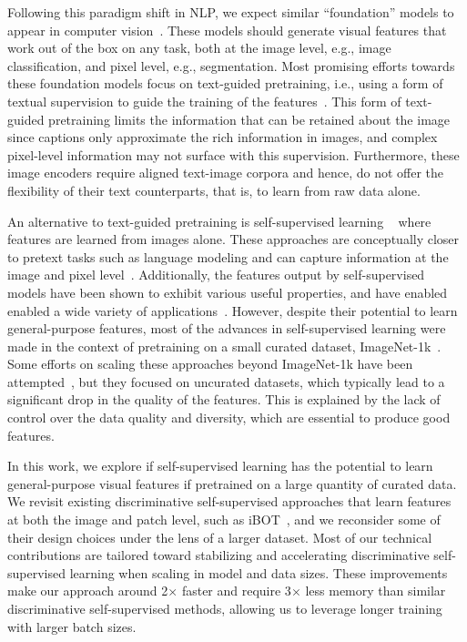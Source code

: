 Following this paradigm shift in NLP, we expect similar ``foundation'' models to appear in computer vision~\citep{bommasani2021opportunities}. These models should generate visual features that work out of the box on any task, both at the image level, e.g., image classification, and pixel level, e.g., segmentation. Most promising efforts towards these foundation models focus on text-guided pretraining, i.e., using a form of textual supervision to guide the training of the features~\citep{joulin2016learning, mahajan2018exploring, radford2021learning}. This form of text-guided pretraining limits the information that can be retained about the image since captions only approximate the rich information in images, and complex pixel-level information may not surface with this supervision. Furthermore, these image encoders require aligned text-image corpora and hence, do not offer the flexibility of their text counterparts, that is, to learn from raw data alone.

An alternative to text-guided pretraining is self-supervised learning ~\citep{caron2018deep, chen2020simple, he2021masked} where features are learned from images alone. These approaches are conceptually closer to pretext tasks such as language modeling and can capture information at the image and pixel level~\citep{caron2021emerging}. Additionally, the features output by self-supervised models have been shown to exhibit various useful properties, and have enabled enabled a wide variety of applications~\citep{amir2021deep, tumanyan2022splicing, ofri2023neural, hamilton2022unsupervised}. However, despite their potential to learn general-purpose features, most of the advances in self-supervised learning were made in the context of pretraining on a small curated dataset, ImageNet-1k~\citep{russakovsky2015imagenet}. Some efforts on scaling these approaches beyond ImageNet-1k have been attempted~\citep{caron2019unsupervised, goyal2021self,goyal2022vision}, but they focused on uncurated datasets, which typically lead to a significant drop in the quality of the features. This is explained by the lack of control over the data quality and diversity, which are essential to produce good features.

In this work, we explore if self-supervised learning has the potential to learn general-purpose visual features if pretrained on a large quantity of curated data. We revisit existing discriminative self-supervised approaches that learn features at both the image and patch level, such as iBOT~\citep{zhou2021ibot}, and we reconsider some of their design choices under the lens of a larger dataset. Most of our technical contributions are tailored toward stabilizing and accelerating discriminative self-supervised learning when scaling in model and data sizes. These improvements make our approach around 2$\times$ faster and require 3$\times$ less memory than similar discriminative self-supervised methods, allowing us to leverage longer training with larger batch sizes. 


